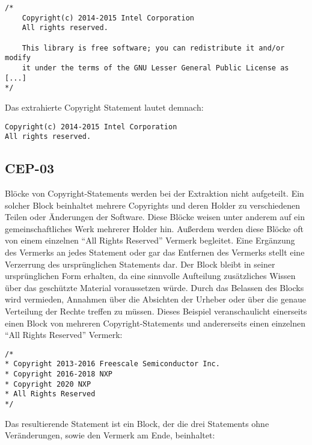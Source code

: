 \begin{lstlisting}[keepspaces=true]
/*
    Copyright(c) 2014-2015 Intel Corporation
    All rights reserved.

    This library is free software; you can redistribute it and/or modify
    it under the terms of the GNU Lesser General Public License as [...]
*/
\end{lstlisting}

Das extrahierte Copyright Statement lautet demnach:

\begin{lstlisting}[keepspaces=true]
Copyright(c) 2014-2015 Intel Corporation
All rights reserved.
\end{lstlisting}


\subsection{CEP-03}\label{subsec:cep-03}

Blöcke von Copyright-Statements werden bei der Extraktion nicht aufgeteilt.
Ein solcher Block beinhaltet mehrere Copyrights und deren Holder zu verschiedenen Teilen oder Änderungen der Software.
Diese Blöcke weisen unter anderem auf ein gemeinschaftliches Werk mehrerer Holder hin.
Außerdem werden diese Blöcke oft von einem einzelnen \enquote{All Rights Reserved} Vermerk begleitet.
Eine Ergänzung des Vermerks an jedes Statement oder gar das Entfernen des Vermerks stellt eine Verzerrung des ursprünglichen Statements dar.
Der Block bleibt in seiner ursprünglichen Form erhalten, da eine sinnvolle Aufteilung zusätzliches Wissen über das geschützte Material voraussetzen würde.
Durch das Belassen des Blocks wird vermieden, Annahmen über die Absichten der Urheber oder über die genaue Verteilung der Rechte treffen zu müssen.
Dieses Beispiel veranschaulicht einerseits einen Block von mehreren Copyright-Statements und andererseits einen einzelnen \enquote{All Rights Reserved} Vermerk:

\begin{lstlisting}[keepspaces=true]
/*
* Copyright 2013-2016 Freescale Semiconductor Inc.
* Copyright 2016-2018 NXP
* Copyright 2020 NXP
* All Rights Reserved
*/
\end{lstlisting}

Das resultierende Statement ist ein Block, der die drei Statements ohne Veränderungen, sowie den Vermerk am Ende, beinhaltet:


